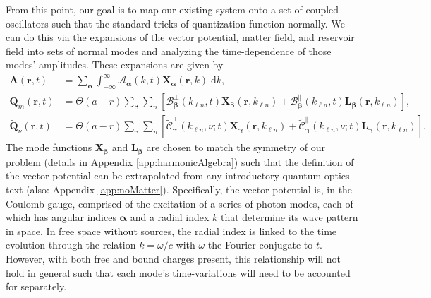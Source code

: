 \documentclass{article}
\begin{document}
From this point, our goal is to map our existing system onto a set of coupled oscillators such that the standard tricks of quantization function normally. We can do this via the expansions of the vector potential, matter field, and reservoir field into sets of normal modes and analyzing the time-dependence of those modes' amplitudes. These expansions are given by
\begin{equation}\label{eq:fieldExpansions}
\begin{split}
\mathbf{A}(\mathbf{r},t) &= \sum_{\bm{\alpha}}\int_{-\infty}^\infty \mathcal{A}_{\bm{\alpha}}(k,t)\mathbf{X}_{\bm{\alpha}}(\mathbf{r},k)\;\mathrm{d}k,\\
\mathbf{Q}_m(\mathbf{r},t) &= \Theta(a - r)\sum_{\bm{\beta}}\sum_n\left[\mathcal{B}_{\bm{\beta}}^\perp(k_{\ell n},t)\mathbf{X}_{\bm{\beta}}(\mathbf{r},k_{\ell n}) + \mathcal{B}_{\bm{\beta}}^\parallel(k_{\ell n},t)\mathbf{L}_{\bm{\beta}}(\mathbf{r},k_{\ell n})\right],\\
\tilde{\mathbf{Q}}_\nu(\mathbf{r},t) &= \Theta(a - r)\sum_{\bm{\gamma}}\sum_n\left[\tilde{\mathcal{C}}_{\bm{\gamma}}^\perp(k_{\ell n},\nu;t)\mathbf{X}_{\bm{\gamma}}(\mathbf{r},k_{\ell n}) + \tilde{\mathcal{C}}_{\bm{\gamma}}^\parallel(k_{\ell n},\nu;t)\mathbf{L}_{\bm{\gamma}}(\mathbf{r},k_{\ell n})\right].
\end{split}
\end{equation}
The mode functions $\mathbf{X}_{\bm{\beta}}$ and $\mathbf{L}_{\bm{\beta}}$ are chosen to match the symmetry of our problem (details in Appendix \ref{app:harmonicAlgebra}) such that the definition of the vector potential can be extrapolated from any introductory quantum optics text (also: Appendix \ref{app:noMatter}). Specifically, the vector potential is, in the Coulomb gauge, comprised of the excitation of a series of photon modes\cite{cohen-tannoudji2004photons}, each of which has angular indices $\bm{\alpha}$ and a radial index $k$ that determine its wave pattern in space. In free space without sources, the radial index is linked to the time evolution through the relation $k = \omega/c$ with $\omega$ the Fourier conjugate to $t$. However, with both free and bound charges present, this relationship will not hold in general such that each mode's time-variations will need to be accounted for separately.
\end{document}
